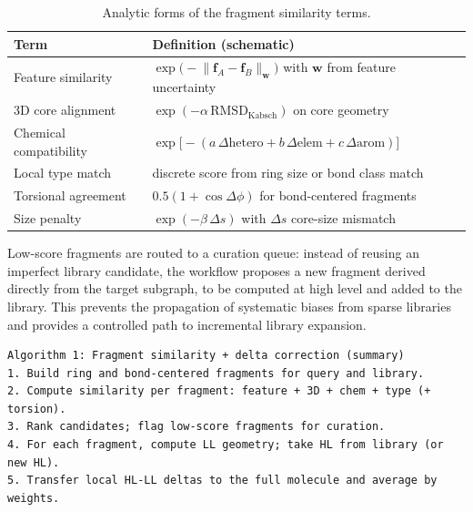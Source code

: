 \documentclass[journal=jctcce,manuscript=article]{achemso}
\begin{document}
\begin{table}[ht]
\caption{Analytic forms of the fragment similarity terms.}
\label{tab:fragment_similarity_forms}
\centering
\begin{tabular}{ll}
\toprule
Term & Definition (schematic) \\
\midrule
Feature similarity & $\exp\!\big(-\lVert \mathbf{f}_A-\mathbf{f}_B\rVert_{\mathbf{w}}\big)$ with $\mathbf{w}$ from feature uncertainty \\
3D core alignment & $\exp(-\alpha\,\mathrm{RMSD}_{\mathrm{Kabsch}})$ on core geometry \\
Chemical compatibility & $\exp\!\big[-(a\,\Delta\mathrm{hetero}+b\,\Delta\mathrm{elem}+c\,\Delta\mathrm{arom})\big]$ \\
Local type match & discrete score from ring size or bond class match \\
Torsional agreement & $0.5(1+\cos\Delta\phi)$ for bond-centered fragments \\
Size penalty & $\exp(-\beta\,\Delta s)$ with $\Delta s$ core-size mismatch \\
\bottomrule
\end{tabular}
\end{table}

Low-score fragments are routed to a curation queue: instead of reusing an imperfect library candidate, the workflow proposes a new fragment derived directly from the target subgraph, to be computed at high level and added to the library. This prevents the propagation of systematic biases from sparse libraries and provides a controlled path to incremental library expansion.

\begin{verbatim}
Algorithm 1: Fragment similarity + delta correction (summary)
1. Build ring and bond-centered fragments for query and library.
2. Compute similarity per fragment: feature + 3D + chem + type (+ torsion).
3. Rank candidates; flag low-score fragments for curation.
4. For each fragment, compute LL geometry; take HL from library (or new HL).
5. Transfer local HL-LL deltas to the full molecule and average by weights.
\end{verbatim}
\end{document}
